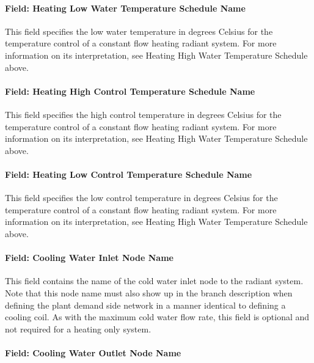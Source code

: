 \paragraph{Field: Heating Low Water Temperature Schedule Name}\label{field-heating-low-water-temperature-schedule-name}

This field specifies the low water temperature in degrees Celsius for the temperature control of a constant flow heating radiant system. For more information on its interpretation, see Heating High Water Temperature Schedule above.

\paragraph{Field: Heating High Control Temperature Schedule Name}\label{field-heating-high-control-temperature-schedule-name}

This field specifies the high control temperature in degrees Celsius for the temperature control of a constant flow heating radiant system. For more information on its interpretation, see Heating High Water Temperature Schedule above.

\paragraph{Field: Heating Low Control Temperature Schedule Name}\label{field-heating-low-control-temperature-schedule-name}

This field specifies the low control temperature in degrees Celsius for the temperature control of a constant flow heating radiant system. For more information on its interpretation, see Heating High Water Temperature Schedule above.

\paragraph{Field: Cooling Water Inlet Node Name}\label{field-cooling-water-inlet-node-name-1}

This field contains the name of the cold water inlet node to the radiant system. Note that this node name must also show up in the branch description when defining the plant demand side network in a manner identical to defining a cooling coil. As with the maximum cold water flow rate, this field is optional and not required for a heating only system.

\paragraph{Field: Cooling Water Outlet Node Name}\label{field-cooling-water-outlet-node-name-1}

